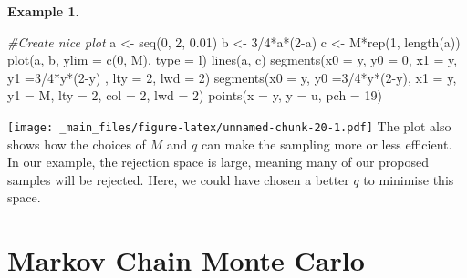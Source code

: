 \documentclass[
]{book}
\newenvironment{Shaded}{\begin{snugshade}}{\end{snugshade}}
\newcommand{\AttributeTok}[1]{\textcolor[rgb]{0.77,0.63,0.00}{#1}}
\newcommand{\CommentTok}[1]{\textcolor[rgb]{0.56,0.35,0.01}{\textit{#1}}}
\newcommand{\DecValTok}[1]{\textcolor[rgb]{0.00,0.00,0.81}{#1}}
\newcommand{\FloatTok}[1]{\textcolor[rgb]{0.00,0.00,0.81}{#1}}
\newcommand{\FunctionTok}[1]{\textcolor[rgb]{0.00,0.00,0.00}{#1}}
\newcommand{\NormalTok}[1]{#1}
\newcommand{\OtherTok}[1]{\textcolor[rgb]{0.56,0.35,0.01}{#1}}
\newcommand{\SpecialCharTok}[1]{\textcolor[rgb]{0.00,0.00,0.00}{#1}}
\newcommand{\StringTok}[1]{\textcolor[rgb]{0.31,0.60,0.02}{#1}}
\theoremstyle{definition}
\theoremstyle{definition}
\newtheorem{example}{Example}[chapter]
\theoremstyle{definition}
\theoremstyle{definition}
\theoremstyle{remark}
\begin{document}
\begin{example}
\begin{Shaded}
\begin{Highlighting}[]
\CommentTok{\#Create nice plot}
\NormalTok{a }\OtherTok{\textless{}{-}} \FunctionTok{seq}\NormalTok{(}\DecValTok{0}\NormalTok{, }\DecValTok{2}\NormalTok{, }\FloatTok{0.01}\NormalTok{)}
\NormalTok{b }\OtherTok{\textless{}{-}} \DecValTok{3}\SpecialCharTok{/}\DecValTok{4}\SpecialCharTok{*}\NormalTok{a}\SpecialCharTok{*}\NormalTok{(}\DecValTok{2}\SpecialCharTok{{-}}\NormalTok{a)}
\NormalTok{c }\OtherTok{\textless{}{-}}\NormalTok{ M}\SpecialCharTok{*}\FunctionTok{rep}\NormalTok{(}\DecValTok{1}\NormalTok{, }\FunctionTok{length}\NormalTok{(a))}
\FunctionTok{plot}\NormalTok{(a, b, }\AttributeTok{ylim =} \FunctionTok{c}\NormalTok{(}\DecValTok{0}\NormalTok{, M), }\AttributeTok{type =} \StringTok{\textquotesingle{}l\textquotesingle{}}\NormalTok{)}
\FunctionTok{lines}\NormalTok{(a, c)}
\FunctionTok{segments}\NormalTok{(}\AttributeTok{x0 =}\NormalTok{ y, }\AttributeTok{y0 =} \DecValTok{0}\NormalTok{, }\AttributeTok{x1 =}\NormalTok{ y,  }\AttributeTok{y1 =}\DecValTok{3}\SpecialCharTok{/}\DecValTok{4}\SpecialCharTok{*}\NormalTok{y}\SpecialCharTok{*}\NormalTok{(}\DecValTok{2}\SpecialCharTok{{-}}\NormalTok{y) , }\AttributeTok{lty =} \DecValTok{2}\NormalTok{, }\AttributeTok{lwd =} \DecValTok{2}\NormalTok{)}
\FunctionTok{segments}\NormalTok{(}\AttributeTok{x0 =}\NormalTok{ y,  }\AttributeTok{y0 =}\DecValTok{3}\SpecialCharTok{/}\DecValTok{4}\SpecialCharTok{*}\NormalTok{y}\SpecialCharTok{*}\NormalTok{(}\DecValTok{2}\SpecialCharTok{{-}}\NormalTok{y), }\AttributeTok{x1 =}\NormalTok{ y, }\AttributeTok{y1 =}\NormalTok{ M, }\AttributeTok{lty =} \DecValTok{2}\NormalTok{, }\AttributeTok{col =} \DecValTok{2}\NormalTok{, }\AttributeTok{lwd =} \DecValTok{2}\NormalTok{)}
\FunctionTok{points}\NormalTok{(}\AttributeTok{x =}\NormalTok{ y, }\AttributeTok{y =}\NormalTok{ u, }\AttributeTok{pch =} \DecValTok{19}\NormalTok{)}
\end{Highlighting}
\end{Shaded}

\texttt{[image: \_main\_files/figure-latex/unnamed-chunk-20-1.pdf]}
The plot also shows how the choices of \(M\) and \(q\) can make the sampling more or less efficient. In our example, the rejection space is large, meaning many of our proposed samples will be rejected. Here, we could have chosen a better \(q\) to minimise this space.
\end{example}

\hypertarget{markov-chain-monte-carlo}{%
\section{Markov Chain Monte Carlo}\label{markov-chain-monte-carlo}}
\end{document}
